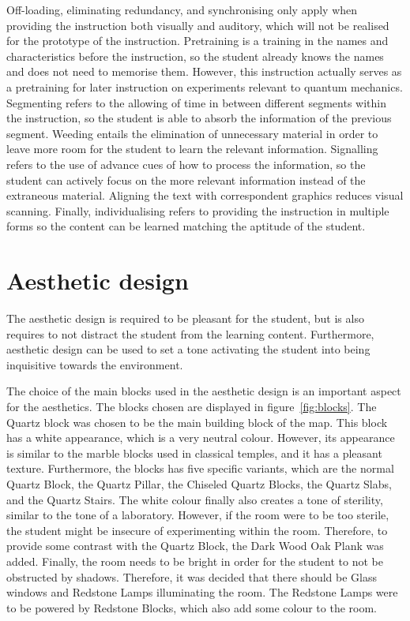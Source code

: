 \documentclass[11pt,twoside]{report} %
\begin{document}
Off-loading, eliminating redundancy, and synchronising only apply when providing the instruction both visually and auditory, which will not be realised for the prototype of the instruction. Pretraining is a training in the names and characteristics before the instruction, so the student already knows the names and does not need to memorise them. However, this instruction actually serves as a pretraining for later instruction on experiments relevant to quantum mechanics. Segmenting refers to the allowing of time in between different segments within the instruction, so the student is able to absorb the information of the previous segment. Weeding entails the elimination of unnecessary material in order to leave more room for the student to learn the relevant information. Signalling refers to the use of advance cues of how to process the information, so the student can actively focus on the more relevant information instead of the extraneous material. Aligning the text with correspondent graphics reduces visual scanning. Finally, individualising refers to providing the instruction in multiple forms so the content can be learned matching the aptitude of the student.

\section{Aesthetic design}

The aesthetic design is required to be pleasant for the student, but is also requires to not distract the student from the learning content. Furthermore, aesthetic design can be used to set a tone activating the student into being inquisitive towards the environment.

The choice of the main blocks used in the aesthetic design is an important aspect for the aesthetics. The blocks chosen are displayed in figure~\ref{fig:blocks}. The Quartz block was chosen to be the main building block of the map. This block has a white appearance, which is a very neutral colour. However, its appearance is similar to the marble blocks used in classical temples, and it has a pleasant texture. Furthermore, the blocks has five specific variants, which are the normal Quartz Block, the Quartz Pillar, the Chiseled Quartz Blocks, the Quartz Slabs, and the Quartz Stairs. The white colour finally also creates a tone of sterility, similar to the tone of a laboratory. However, if the room were to be too sterile, the student might be insecure of experimenting within the room. Therefore, to provide some contrast with the Quartz Block, the Dark Wood Oak Plank was added. Finally, the room needs to be bright in order for the student to not be obstructed by shadows. Therefore, it was decided that there should be Glass windows and Redstone Lamps illuminating the room. The Redstone Lamps were to be powered by Redstone Blocks, which also add some colour to the room.
\end{document}
